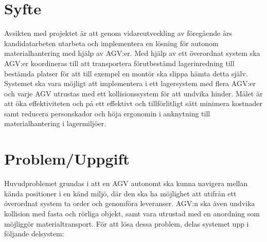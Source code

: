 \documentclass[a4paper,11pt]{article}
\begin{document}
\section{Syfte}
Avsikten med projektet är att genom vidareutveckling av föregående års
kandidatarbeten utarbeta och implementera en lösning för autonom
materialhantering med hjälp av AGV:er. Med hjälp av ett överordnat system
ska AGV:er koordineras till att transportera förutbestämd lagerinredning
till bestämda platser för att till exempel en montör ska slippa hämta detta
själv. Systemet ska vara möjligt att implementera i ett lagersystem med
flera AGV:er och varje AGV utrustas med ett kollisionssystem för att
undvika hinder. Målet är att öka effektiviteten och på ett effektivt och
tillförlitligt sätt minimera kostnader samt reducera personskador och höja
ergonomin i anknytning till materialhantering i lagermiljöer. 


\section{Problem/Uppgift}
Huvudproblemet grundas i att en AGV autonomt ska kunna navigera mellan
kända positioner i en känd miljö, där den ska ha möjlighet att utifrån ett
överordnat system ta order och genomföra leveranser. AGV:n ska även undvika
kollision med fasta och rörliga objekt, samt vara utrustad med en anordning
som möjliggör materialtransport. För att lösa dessa problem, delas systemet
upp i följande delsystem:
\end{document}
